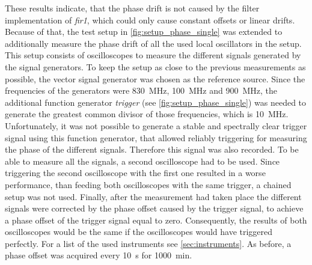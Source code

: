 \documentclass[12pt,a4paper,parskip=full,abstract=true,BCOR=12mm,twoside,open=right]{scrreprt}
\def\device#1{\mbox{\textit{#1}}}
\begin{document}
These results indicate, that the phase drift is not caused by the filter implementation of
\device{fir1}, which could only cause constant offsets or linear drifts. Because of that, the test
setup in \cref{fig:setup_phase_single} was extended to additionally measure the phase drift of all the
used local oscillators in the setup. This setup consists of oscilloscopes to measure
the different signals generated by the signal generators. To keep the setup as close to the previous measurements as possible, the
vector signal generator was chosen as the reference source. Since the frequencies
of the generators were \SI{830}{\mega\hertz}, \SI{100}{\mega\hertz} and \SI{900}{\mega\hertz},
the additional function generator \device{trigger} (see \cref{fig:setup_phase_single}) was needed to
generate the greatest common divisor of those frequencies, which is \SI{10}{\mega\hertz}.
Unfortunately, it was not possible to generate a stable and spectrally clear trigger signal using this function generator, that
allowed reliably triggering for measuring the phase of the different signals. Therefore this signal was also recorded.
To be able to measure all the signals, a second oscilloscope had to be used. Since triggering
the second oscilloscope with the first one resulted in a worse performance, than feeding both
oscilloscopes with the same trigger, a chained setup was not used. Finally, after the measurement had taken place the
different signals were corrected by the phase offset caused by the trigger signal, to achieve a phase
offset of the trigger signal equal to zero. Consequently, the results of both oscilloscopes would be the same if the oscilloscopes would
have triggered perfectly. For a list of the used instruments see \cref{sec:instruments}. As before, a phase offset was acquired every \SI{10}{\second}
for \SI{1000}{\minute}.
\end{document}
